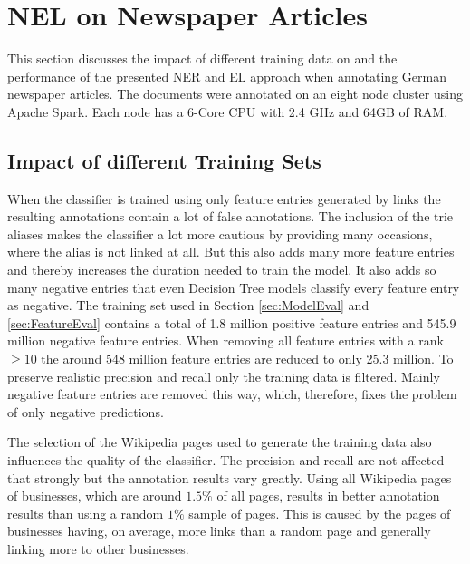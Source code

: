 \section{NEL on Newspaper Articles}
\label{sec:NELEval}
This section discusses the impact of different training data on and the performance of the presented NER and EL approach when annotating German newspaper articles. The documents were annotated on an eight node cluster using Apache Spark. Each node has a 6-Core CPU with 2.4 GHz and 64GB of RAM.\par

\subsection*{Impact of different Training Sets}
When the classifier is trained using only feature entries generated by links the resulting annotations contain a lot of false annotations. The inclusion of the trie aliases makes the classifier a lot more cautious by providing many occasions, where the alias is not linked at all. But this also adds many more feature entries and thereby increases the duration needed to train the model. It also adds so many negative entries that even Decision Tree models classify every feature entry as negative. The training set used in Section \ref{sec:ModelEval} and \ref{sec:FeatureEval} contains a total of 1.8 million positive feature entries and 545.9 million negative feature entries. When removing all feature entries with a rank $\geq 10$ the around 548 million feature entries are reduced to only 25.3 million. To preserve realistic precision and recall only the training data is filtered. Mainly negative feature entries are removed this way, which, therefore, fixes the problem of only negative predictions.\par
The selection of the Wikipedia pages used to generate the training data also influences the quality of the classifier. The precision and recall are not affected that strongly but the annotation results vary greatly. Using all Wikipedia pages of businesses, which are around $1.5\%$ of all pages, results in better annotation results than using a random $1\%$ sample of pages. This is caused by the pages of businesses having, on average, more links than a random page and generally linking more to other businesses.\par

